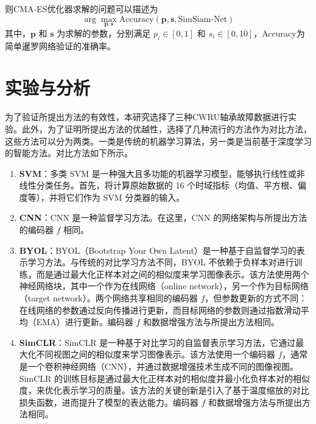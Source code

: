 \documentclass[master]{thesis-uestc}
\begin{document}
则CMA-ES优化器求解的问题可以描述为 
\begin{equation}
    \arg\max_{\mathbf{p}, \mathbf{s}} \text{Accuracy}(\mathbf{p}, \mathbf{s}, \text{SimSiam-Net})
\end{equation}
其中，\(\mathbf{p}\) 和 \(\mathbf{s}\) 为求解的参数，分别满足 \(p_i \in [0, 1]\) 和 \(s_i \in [0, 10]\)，Accuracy为简单暹罗网络验证的准确率。

\section{实验与分析}
为了验证所提出方法的有效性，本研究选择了三种CWRU轴承故障数据进行实验。此外，为了证明所提出方法的优越性，选择了几种流行的方法作为对比方法，这些方法可以分为两类。一类是传统的机器学习算法，另一类是当前基于深度学习的智能方法。对比方法如下所示。
\begin{enumerate}
    \item \textbf{SVM}：多类 SVM 是一种强大且多功能的机器学习模型，能够执行线性或非线性分类任务。首先，将计算原始数据的 16 个时域指标（均值、平方根、偏度等），并将它们作为 SVM 分类器的输入。

    \item \textbf{CNN}：CNN 是一种监督学习方法。在这里，CNN 的网络架构与所提出方法的编码器 \(f\) 相同。

    \item \textbf{BYOL}：BYOL（Bootstrap Your Own Latent）是一种基于自监督学习的表示学习方法。与传统的对比学习方法不同，BYOL 不依赖于负样本对进行训练，而是通过最大化正样本对之间的相似度来学习图像表示。该方法使用两个神经网络块，其中一个作为在线网络（online network），另一个作为目标网络（target network）。两个网络共享相同的编码器 \(f\)，但参数更新的方式不同：在线网络的参数通过反向传播进行更新，而目标网络的参数则通过指数滑动平均（EMA）进行更新。编码器 \(f\) 和数据增强方法与所提出方法相同。
    
    \item \textbf{SimCLR}：SimCLR 是一种基于对比学习的自监督表示学习方法，它通过最大化不同视图之间的相似度来学习图像表示。该方法使用一个编码器 \(f\)，通常是一个卷积神经网络（CNN），并通过数据增强技术生成不同的图像视图。SimCLR 的训练目标是通过最大化正样本对的相似度并最小化负样本对的相似度，来优化表示学习的质量。该方法的关键创新是引入了基于温度缩放的对比损失函数，进而提升了模型的表达能力。编码器 \(f\) 和数据增强方法与所提出方法相同。

\end{enumerate}
\end{document}
